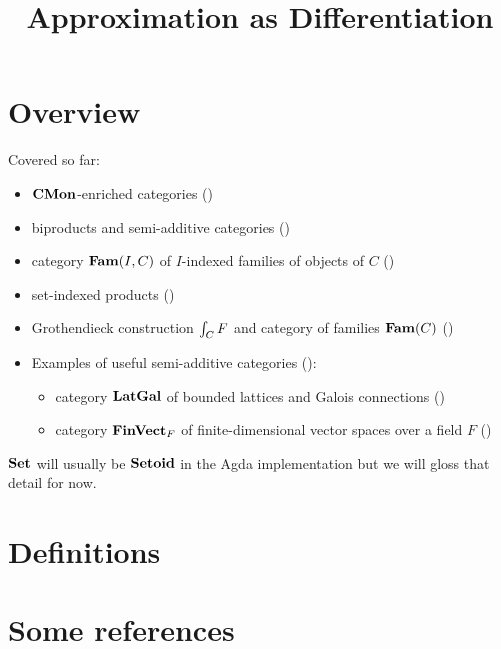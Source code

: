 \documentclass[acmsmall,nonacm]{acmart}
\begin{document}
\title{Approximation as Differentiation}
\maketitle

\section{Overview}

Covered so far:
\begin{itemize}
\item $\mathbf{CMon}$-enriched categories ()
\item biproducts and semi-additive categories ()
\item category $\mathbf{Fam}(I,C)$ of $I$-indexed families of objects of $C$ ()
\item set-indexed products ()
\item Grothendieck construction $\int_{C}F$ and category of families $\mathbf{Fam}(C)$ ()
\item Examples of useful semi-additive categories ():
   \begin{itemize}
   \item category $\mathbf{LatGal}$ of bounded lattices and Galois connections ()
   \item category $\mathbf{FinVect}_F$ of finite-dimensional vector spaces over a field $F$
   ()
   \end{itemize}
\end{itemize}

\noindent $\mathbf{Set}$ will usually be $\mathbf{Setoid}$ in the Agda implementation but we will gloss that detail for now.



\section{Definitions}








% 

\section{Some references}

\cite{karvonen2020}



\end{document}
